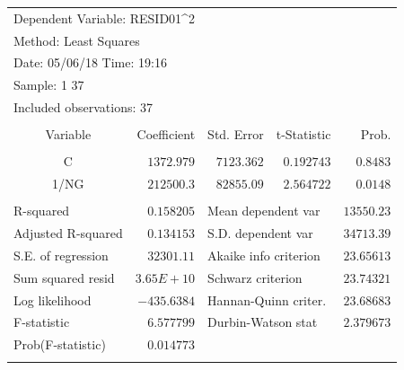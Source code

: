 \documentclass[12pt]{report}
\begin{document}
\begin{table}[H]
	\centering
	\begin{tabular}{lrrrr}
		\multicolumn{3}{l}{Dependent Variable: RESID01\textasciicircum 2}&\multicolumn{1}{c}{}&\multicolumn{1}{c}{}\\
		\multicolumn{3}{l}{Method: Least Squares}&\multicolumn{1}{c}{}&\multicolumn{1}{c}{}\\
		\multicolumn{3}{l}{Date: 05/06/18   Time: 19:16}&\multicolumn{1}{c}{}&\multicolumn{1}{c}{}\\
		\multicolumn{2}{l}{Sample: 1 37}&\multicolumn{1}{c}{}&\multicolumn{1}{c}{}&\multicolumn{1}{c}{}\\
		\multicolumn{3}{l}{Included observations: 37}&\multicolumn{1}{c}{}&\multicolumn{1}{c}{}\\
		[4.5pt] \hline \\ [-4.5pt]
		\multicolumn{1}{c}{Variable}&\multicolumn{1}{r}{Coefficient}&\multicolumn{1}{r}{Std. Error}&\multicolumn{1}{r}{t-Statistic}&\multicolumn{1}{r}{Prob.}\\
		[4.5pt] \hline \\ [-4.5pt]
		\multicolumn{1}{c}{C}&\multicolumn{1}{r}{$1372.979$}&\multicolumn{1}{r}{$7123.362$}&\multicolumn{1}{r}{$0.192743$}&\multicolumn{1}{r}{$0.8483$}\\
		\multicolumn{1}{c}{1/NG}&\multicolumn{1}{r}{$212500.3$}&\multicolumn{1}{r}{$82855.09$}&\multicolumn{1}{r}{$2.564722$}&\multicolumn{1}{r}{$0.0148$}\\
		[4.5pt] \hline \\ [-4.5pt]
		\multicolumn{1}{l}{R-squared}&\multicolumn{1}{r}{$0.158205$}&\multicolumn{2}{l}{Mean dependent var}&\multicolumn{1}{r}{$13550.23$}\\
		\multicolumn{1}{l}{Adjusted R-squared}&\multicolumn{1}{r}{$0.134153$}&\multicolumn{2}{l}{S.D. dependent var}&\multicolumn{1}{r}{$34713.39$}\\
		\multicolumn{1}{l}{S.E. of regression}&\multicolumn{1}{r}{$32301.11$}&\multicolumn{2}{l}{Akaike info criterion}&\multicolumn{1}{r}{$23.65613$}\\
		\multicolumn{1}{l}{Sum squared resid}&\multicolumn{1}{r}{$3.65E+10$}&\multicolumn{2}{l}{Schwarz criterion}&\multicolumn{1}{r}{$23.74321$}\\
		\multicolumn{1}{l}{Log likelihood}&\multicolumn{1}{r}{$-435.6384$}&\multicolumn{2}{l}{Hannan-Quinn criter.}&\multicolumn{1}{r}{$23.68683$}\\
		\multicolumn{1}{l}{F-statistic}&\multicolumn{1}{r}{$6.577799$}&\multicolumn{2}{l}{Durbin-Watson stat}&\multicolumn{1}{r}{$2.379673$}\\
		\multicolumn{1}{l}{Prob(F-statistic)}&\multicolumn{1}{r}{$0.014773$}&\multicolumn{1}{c}{}&\multicolumn{1}{c}{}&\multicolumn{1}{c}{}\\
		[4.5pt] \hline \\ [-4.5pt]
	\end{tabular}
\end{table}
\end{document}
